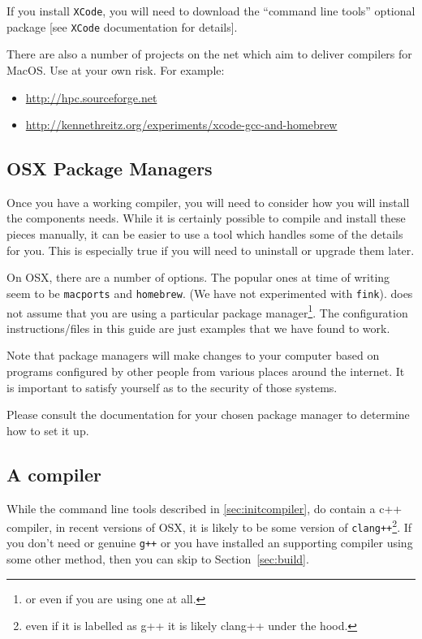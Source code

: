 If you install \texttt{XCode}, you will need to download the ``command line tools'' optional package [see \texttt{XCode} documentation for details].

There are also a number of projects on the net which aim to deliver compilers for MacOS.
Use at your own risk.
For example:
\begin{itemize}
 \item \url{http://hpc.sourceforge.net}
 \item \url{http://kennethreitz.org/experiments/xcode-gcc-and-homebrew}
\end{itemize}

\subsection{OSX Package Managers}\label{sec:osxpackagemanager}
Once you have a working compiler, you will need to consider how you will install the components \escript needs.
While it is certainly possible to compile and install these pieces manually, it can be easier to use a tool
which handles some of the details for you.
This is especially true if you will need to uninstall or upgrade them later.

On OSX, there are a number of options. 
The popular ones at time of writing seem to be \texttt{macports} and \texttt{homebrew}.
(We have not experimented with \texttt{fink}).
\escript does not assume that you are using a particular package manager\footnote{or even if you are using one at all.}.
The configuration instructions/files in this guide are just examples that we have found to work.

Note that package managers will make changes to your computer based on programs configured by other people from 
various places around the internet.
It is important to satisfy yourself as to the security of those systems.

Please consult the documentation for your chosen package manager to determine how to set it up.

\subsection{A compiler}\label{sec:osxcompiler}
While the command line tools described in \ref{sec:initcompiler}, do contain a c++ compiler, in recent versions of OSX, 
it is likely to be some version of \texttt{clang++}\footnote{even if it is 
labelled as g++ it is likely clang++ under the hood.}.
If you don't need \openmp or genuine \texttt{g++} or you have installed an \openmp supporting compiler
using some other method, then you can skip to Section~\ref{sec:build}.

